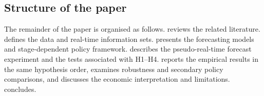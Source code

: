 \subsection{Structure of the paper}
\label{subsec:paper_structure}

The remainder of the paper is organised as follows.  reviews the related literature.  defines the data and real-time information sets.  presents the forecasting models and stage-dependent policy framework.  describes the pseudo-real-time forecast experiment and the tests associated with H1--H4.  reports the empirical results in the same hypothesis order,  examines robustness and secondary policy comparisons, and  discusses the economic interpretation and limitations.  concludes.
